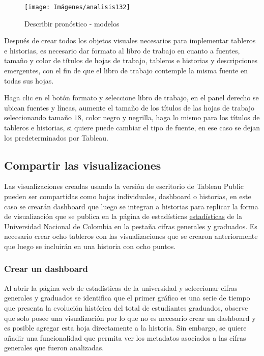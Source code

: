 \documentclass[
]{book}
\begin{document}
\begin{figure}

{\centering \texttt{[image: Imágenes/analisis132]} 

}

\caption{Describir pronóstico - modelos}\label{fig:modelospronosticos-fig}
\end{figure}

Después de crear todos los objetos visuales necesarios para implementar tableros e historias, es necesario dar formato al libro de trabajo en cuanto a fuentes, tamaño y color de títulos de hojas de trabajo, tableros e historias y descripciones emergentes, con el fin de que el libro de trabajo contemple la misma fuente en todas sus hojas.

Haga clic en el botón formato y seleccione libro de trabajo, en el panel derecho se ubican fuentes y líneas, aumente el tamaño de los títulos de las hojas de trabajo seleccionando tamaño \(18\), color negro y negrilla, haga lo mismo para los títulos de tableros e historias, si quiere puede cambiar el tipo de fuente, en ese caso se dejan los predeterminados por Tableau.

\hypertarget{compartir-las-visualizaciones}{%
\subsection{Compartir las visualizaciones}\label{compartir-las-visualizaciones}}

Las visualizaciones creadas usando la versión de escritorio de Tableau Public pueden ser compartidas como hojas individuales, dashboard o historias, en este caso se crearán dashboard que luego se integran a historias para replicar la forma de visualización que se publica en la página de estadísticas \href{http://estadisticas.unal.edu.co/home/}{estadísticas} de la Universidad Nacional de Colombia en la pestaña cifras generales y graduados. Es necesario crear ocho tableros con las visualizaciones que se crearon anteriormente que luego se incluirán en una historia con ocho puntos.

\hypertarget{crear-un-dashboard}{%
\subsubsection{Crear un dashboard}\label{crear-un-dashboard}}

Al abrir la página web de estadísticas de la universidad y seleccionar cifras generales y graduados se identifica que el primer gráfico es una serie de tiempo que presenta la evolución histórica del total de estudiantes graduados, observe que solo posee una visualización por lo que no es necesario crear un dashboard y es posible agregar esta hoja directamente a la historia. Sin embargo, se quiere añadir una funcionalidad que permita ver los metadatos asociados a las cifras generales que fueron analizadas.
\end{document}
